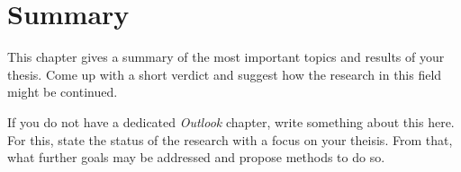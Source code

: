 \chapter{Summary}

This chapter gives a summary of the most important topics and results of your thesis.
Come up with a short verdict and suggest how the research in this field might be continued.

If you do not have a dedicated \textit{Outlook} chapter, write something about this here.
For this, state the status of the research with a focus on your theisis.
From that, what further goals may be addressed and propose methods to do so.

